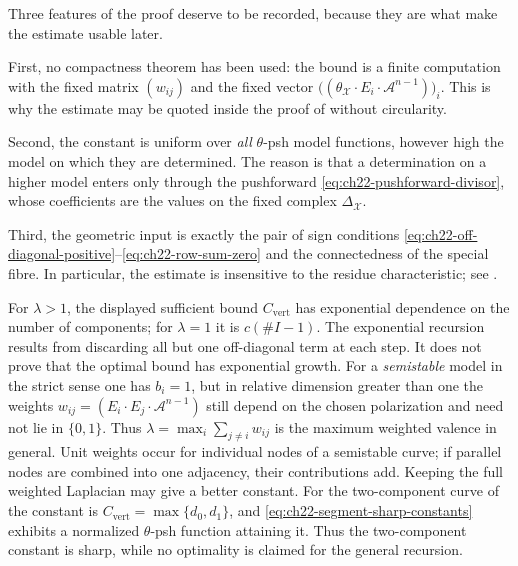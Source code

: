 \begin{remark}
\label{rem:ch22-vertex-estimate-nature}
Three features of the proof deserve to be recorded, because they are what
make the estimate usable later.

First, no compactness theorem has been used: the bound is a finite
computation with the fixed matrix $(w_{ij})$ and the fixed vector
$\bigl((\theta_{\mathcal X}\cdot E_i\cdot\mathcal A^{n-1})\bigr)_i$.  This
is why the estimate may be quoted inside the proof of
 without circularity.

Second, the constant is uniform over \emph{all} $\theta$-psh model
functions, however high the model on which they are determined.  The reason
is that a determination on a higher model enters only through the
pushforward \eqref{eq:ch22-pushforward-divisor}, whose coefficients are the
values on the fixed complex $\Delta_{\mathcal X}$.

Third, the geometric input is exactly the pair of sign conditions
\eqref{eq:ch22-off-diagonal-positive}--\eqref{eq:ch22-row-sum-zero} and the
connectedness of the special fibre.  In particular, the estimate is
insensitive to the residue characteristic; see
.
\end{remark}

\begin{remark}
\label{rem:ch22-exponential-constant}
For $\lambda>1$, the displayed sufficient bound
$C_{\mathrm{vert}}$ has exponential dependence on the number of components;
for $\lambda=1$ it is $c(\#I-1)$.  The exponential recursion results from
discarding all but one off-diagonal term at each step.  It does not prove
that the optimal bound has exponential growth.  For a \emph{semistable} model in the
strict
sense one has $b_i=1$, but in relative dimension greater than one the
weights
$w_{ij}=(E_i\cdot E_j\cdot\mathcal A^{n-1})$ still depend on the chosen
polarization and need not lie in $\{0,1\}$.  Thus
$\lambda=\max_i\sum_{j\ne i}w_{ij}$ is the maximum weighted valence in
general.  Unit weights occur for individual nodes of a semistable curve; if
parallel nodes are combined into one adjacency, their contributions add.
Keeping the full weighted Laplacian may give a better constant.  For the
two-component curve of
 the constant is $C_{\mathrm{vert}}=
\max\{d_0,d_1\}$, and \eqref{eq:ch22-segment-sharp-constants} exhibits a
normalized $\theta$-psh function attaining it.  Thus the two-component
constant is sharp, while no optimality is claimed for the general recursion.
\end{remark}

